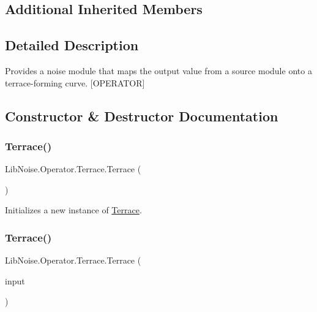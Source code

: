 \subsection*{Additional Inherited Members}


\subsection{Detailed Description}
Provides a noise module that maps the output value from a source module onto a terrace-\/forming curve. \mbox{[}O\+P\+E\+R\+A\+T\+OR\mbox{]} 



\subsection{Constructor \& Destructor Documentation}
\mbox{\label{class_lib_noise_1_1_operator_1_1_terrace_a6b9c3c77fe6887b101fa6a37e0da3b63}} 
\subsubsection{\texorpdfstring{Terrace()}{Terrace()}\hspace{0.1cm}{\footnotesize\ttfamily [1/3]}}
{\footnotesize\ttfamily Lib\+Noise.\+Operator.\+Terrace.\+Terrace (\begin{DoxyParamCaption}{ }\end{DoxyParamCaption})}



Initializes a new instance of \hyperlink{class_lib_noise_1_1_operator_1_1_terrace}{Terrace}. 

\mbox{\label{class_lib_noise_1_1_operator_1_1_terrace_ada82fd7c88b07402d18baca7ca52648f}} 
\subsubsection{\texorpdfstring{Terrace()}{Terrace()}\hspace{0.1cm}{\footnotesize\ttfamily [2/3]}}
{\footnotesize\ttfamily Lib\+Noise.\+Operator.\+Terrace.\+Terrace (\begin{DoxyParamCaption}\item[{\hyperlink{class_lib_noise_1_1_module_base}{Module\+Base}}]{input }\end{DoxyParamCaption})}



